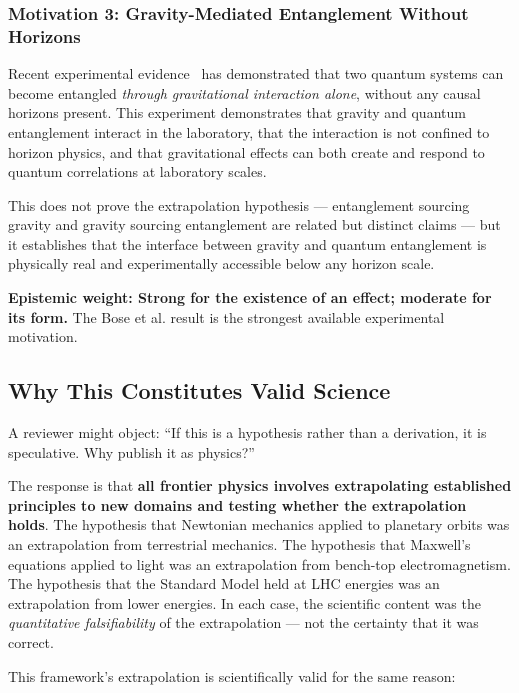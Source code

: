 \subsubsection{Motivation 3: Gravity-Mediated Entanglement Without Horizons}

Recent experimental evidence~\cite{bose2023} has demonstrated that two
quantum systems can become entangled \emph{through gravitational interaction
alone}, without any causal horizons present. This experiment demonstrates
that gravity and quantum entanglement interact in the laboratory, that the
interaction is not confined to horizon physics, and that gravitational
effects can both create and respond to quantum correlations at laboratory
scales.

This does not prove the extrapolation hypothesis --- entanglement sourcing
gravity and gravity sourcing entanglement are related but distinct claims
--- but it establishes that the interface between gravity and quantum
entanglement is physically real and experimentally accessible below any
horizon scale.

\textbf{Epistemic weight: Strong for the existence of an effect; moderate
for its form.} The Bose et al. result is the strongest available
experimental motivation.

\subsection{Why This Constitutes Valid Science}
\label{subsec:valid_science}

A reviewer might object: ``If this is a hypothesis rather than a derivation,
it is speculative. Why publish it as physics?''

The response is that \textbf{all frontier physics involves extrapolating
established principles to new domains and testing whether the extrapolation
holds}. The hypothesis that Newtonian mechanics applied to planetary orbits
was an extrapolation from terrestrial mechanics. The hypothesis that
Maxwell's equations applied to light was an extrapolation from bench-top
electromagnetism. The hypothesis that the Standard Model held at LHC energies
was an extrapolation from lower energies. In each case, the scientific
content was the \emph{quantitative falsifiability} of the extrapolation ---
not the certainty that it was correct.

This framework's extrapolation is scientifically valid for the same reason:

